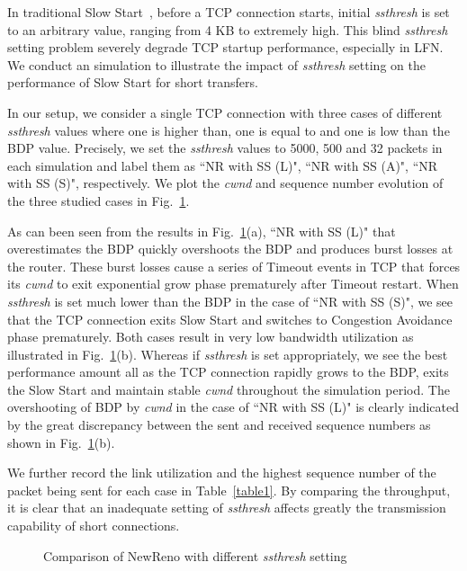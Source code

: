 \documentclass[12pt,onecolumn]{IEEEtran}
\begin{document}
In traditional Slow Start~\cite{reno}, before a TCP connection starts, initial
\emph{ssthresh} is set to an arbitrary value, ranging from 4 KB to extremely
high. This blind \emph{ssthresh} setting problem severely degrade TCP startup
performance, especially in LFN. We conduct an simulation to illustrate the
impact of \emph{ssthresh} setting on the performance of Slow Start for short
transfers.

In our setup, we consider a single TCP connection with three cases of different
\emph{ssthresh} values where one is higher than, one is equal to and one is low
than the BDP value. Precisely, we set the \emph{ssthresh} values to 5000, 500
and 32 packets in each simulation and label them as ``NR with SS (L)", ``NR
with SS (A)", ``NR with SS (S)", respectively. We plot the \emph{cwnd} and
sequence number evolution of the three studied cases in Fig.~\ref{fig_single}.

As can been seen from the results in Fig.~\ref{fig_single}(a), ``NR with SS
(L)" that overestimates the BDP quickly overshoots the BDP and produces burst
losses at the router. These burst losses cause a series of Timeout events in
TCP that forces its \emph{cwnd} to exit exponential grow phase prematurely
after Timeout restart. When \emph{ssthresh} is set much lower than the BDP in
the case of ``NR with SS (S)", we see that the TCP connection exits Slow Start
and switches to Congestion Avoidance phase prematurely. Both cases result in
very low bandwidth utilization as illustrated in Fig.~\ref{fig_single}(b).
Whereas if \emph{ssthresh} is set appropriately, we see the best performance
amount all as the TCP connection rapidly grows to the BDP, exits the Slow Start
and maintain stable \emph{cwnd} throughout the simulation period. The overshooting of BDP by
\emph{cwnd} in the case of ``NR with SS (L)" is clearly indicated by the great
discrepancy between the sent and received sequence numbers as shown in
Fig.~\ref{fig_single}(b).

We further record the link utilization and the highest sequence number of the
packet being sent for each case in Table~\ref{table1}. By comparing the
throughput, it is clear that an inadequate setting of \emph{ssthresh} affects
greatly the transmission capability of short connections.




\begin{figure}[t]
 \centering
  \centering
  \caption{Comparison of NewReno with different \emph{ssthresh} setting}
\label{fig_single}
\end{figure}
\end{document}
